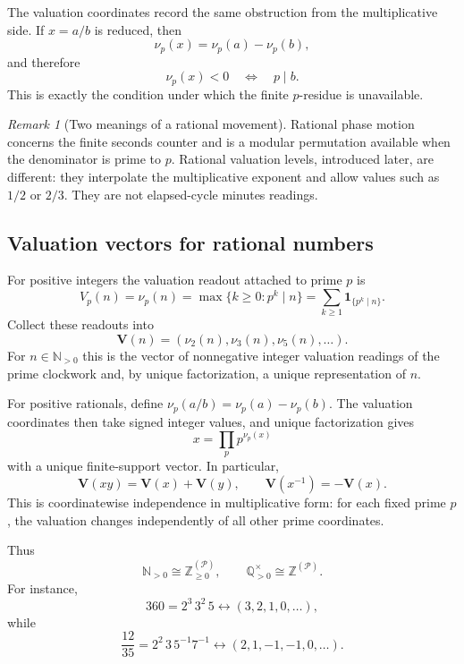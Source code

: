 \documentclass[11pt,a4paper]{article}
\theoremstyle{clockplain}
\theoremstyle{definition}
\theoremstyle{remark}
\newtheorem{remark}[proposition]{Remark}
\newcommand{\Q}{\mathbb Q}
\newcommand{\Z}{\mathbb Z}
\newcommand{\N}{\mathbb N}
\newcommand{\Pset}{\mathcal P}
\newcommand{\V}{\mathbf V}
\newcommand{\vp}{\nu_p}
\begin{document}
The valuation coordinates record the same obstruction from the multiplicative side. If $x=a/b$ is reduced, then
\[
\vp(x)=\vp(a)-\vp(b),
\]
and therefore
\begin{equation}
\vp(x)<0\quad\Longleftrightarrow\quad p\mid b.
\label{eq:negative-missing}
\end{equation}
This is exactly the condition under which the finite $p$-residue is unavailable.

\begin{remark}[Two meanings of a rational movement]
Rational phase motion concerns the finite seconds counter and is a modular permutation available when the denominator is prime to $p$. Rational valuation levels, introduced later, are different: they interpolate the multiplicative exponent and allow values such as $1/2$ or $2/3$. They are not elapsed-cycle minutes readings.
\end{remark}

\subsection{Valuation vectors for rational numbers}

For positive integers the valuation readout attached to prime $p$ is
\begin{equation}
V_p(n)=\nu_p(n)=\max\{k\ge0:p^k\mid n\}
       =\sum_{k\ge1}\mathbf{1}_{\{p^k\mid n\}}.
\end{equation}
Collect these readouts into
\[
\V(n)=(\nu_2(n),\nu_3(n),\nu_5(n),\ldots).
\]
For $n\in\N_{>0}$ this is the vector of nonnegative integer valuation readings of the prime clockwork and, by unique factorization, a unique representation of $n$.

For positive rationals, define $\nu_p(a/b)=\nu_p(a)-\nu_p(b)$. The valuation coordinates then take signed integer values, and unique factorization gives
\begin{equation}
\boxed{x=\prod_p p^{\nu_p(x)}}
\label{eq:reconstruction}
\end{equation}
with a unique finite-support vector. In particular,
\begin{equation}
\V(xy)=\V(x)+\V(y),\qquad \V(x^{-1})=-\V(x).
\label{eq:linear}
\end{equation}
This is coordinatewise independence in multiplicative form: for each fixed prime $p$, the valuation changes independently of all other prime coordinates.

Thus
\[
\N_{>0}\cong\Z_{\ge0}^{(\Pset)},\qquad
\Q_{>0}^{\times}\cong\Z^{(\Pset)}.
\]
For instance,
\[
360=2^3\,3^2\,5\longleftrightarrow(3,2,1,0,\ldots),
\]
while
\[
\frac{12}{35}=2^2\,3\,5^{-1}7^{-1}\longleftrightarrow(2,1,-1,-1,0,\ldots).
\]
\end{document}
